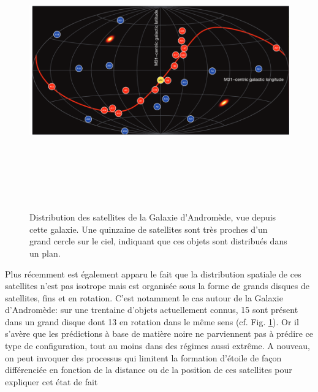 \begin{figure}[htbp]
	\centering
		\includegraphics[height=12cm]{figs/planM31.png}
	\caption{Distribution des satellites de la Galaxie d'Andromède, vue depuis cette galaxie. Une quinzaine de satellites sont très proches d'un grand cercle sur le ciel, indiquant que ces objets sont distribués dans un plan.} 
	\label{f:planM31}
\end{figure}

Plus récemment est également apparu le fait que la distribution spatiale de ces satellites n'est pas isotrope mais est organisée sous la forme de grands disques de satellites, fins et en rotation. C'est notamment le cas autour de la Galaxie d'Andromède: sur une trentaine d'objets actuellement connus, 15 sont présent dans un grand disque dont 13 en rotation dans le même sens (cf. Fig. \ref{f:planM31}). Or il s'avère que les prédictions à base de matière noire ne parviennent pas à prédire ce type de configuration, tout au moins dans des régimes aussi extrême.  A nouveau, on peut invoquer des processus qui limitent la formation d'étoile de façon différenciée en fonction de la distance ou de la position de ces satellites pour expliquer cet état de fait 

